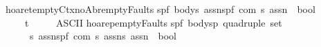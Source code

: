 \begin{isabellebody}
\isanewline
{\isachardoublequoteopen}{\isacharunderscore}hoaret{\isacharunderscore}emptyCtx{\isacharunderscore}noAbr{\isacharunderscore}emptyFaults{\isachardoublequoteclose}{\isacharcolon}{\isacharcolon}\isanewline
{\isachardoublequoteopen}{\isacharbrackleft}{\isacharparenleft}{\isacharprime}s{\isacharcomma}{\isacharprime}p{\isacharcomma}{\isacharprime}f{\isacharparenright}\ body{\isacharcomma}{\isacharprime}s\ assn{\isacharcomma}{\isacharparenleft}{\isacharprime}s{\isacharcomma}{\isacharprime}p{\isacharcomma}{\isacharprime}f{\isacharparenright}\ com{\isacharcomma}\ {\isacharprime}s\ assn{\isacharbrackright}\ {\isacharequal}{\isachargreater}\ bool{\isachardoublequoteclose}\isanewline
\ \ \ \ {\isacharparenleft}{\isachardoublequoteopen}{\isacharparenleft}{}{\isacharunderscore}{\isacharslash}{\isasymturnstile}\isactrlsub t\ {\isacharparenleft}{\isacharunderscore}{\isacharslash}\ {\isacharparenleft}{\isacharunderscore}{\isacharparenright}{\isacharslash}\ {\isacharunderscore}{\isacharparenright}{\isacharparenright}{\isachardoublequoteclose}\ {\isacharbrackleft}{}{}{\isacharcomma}{}{}{}{}{\isacharcomma}{}{}{\isacharcomma}{}{}{}{}{\isacharbrackright}{}{}{\isacharparenright}\isanewline
\isanewline
\isanewline
{}\isamarkupfalse%
\ {\isacharparenleft}ASCII{\isacharparenright}\isanewline
\isanewline
{\isachardoublequoteopen}{\isacharunderscore}hoarep{\isacharunderscore}emptyFaults{\isachardoublequoteclose}{\isacharcolon}{\isacharcolon}\isanewline
{\isachardoublequoteopen}{\isacharbrackleft}{\isacharparenleft}{\isacharprime}s{\isacharcomma}{\isacharprime}p{\isacharcomma}{\isacharprime}f{\isacharparenright}\ body{\isacharcomma}{\isacharparenleft}{\isacharprime}s{\isacharcomma}{\isacharprime}p{\isacharparenright}\ quadruple\ set{\isacharcomma}\isanewline
\ \ \ \ \ {\isacharprime}s\ assn{\isacharcomma}{\isacharparenleft}{\isacharprime}s{\isacharcomma}{\isacharprime}p{\isacharcomma}{\isacharprime}f{\isacharparenright}\ com{\isacharcomma}\ {\isacharprime}s\ assn{\isacharcomma}{\isacharprime}s\ assn{\isacharbrackright}\ {\isasymRightarrow}\ bool{\isachardoublequoteclose}\isanewline
\ \ \ {\isacharparenleft}{\isachardoublequoteopen}{\isacharparenleft}{}{\isacharunderscore}{\isacharcomma}{\isacharunderscore}{\isacharslash}{\isacharbar}{\isacharminus}\ {\isacharparenleft}{\isacharunderscore}{\isacharslash}\ {\isacharparenleft}{\isacharunderscore}{\isacharparenright}{\isacharslash}\ {\isacharunderscore}{\isacharcomma}{\isacharslash}{\isacharunderscore}{\isacharparenright}{\isacharparenright}{\isachardoublequoteclose}\ {\isacharbrackleft}{}{}{\isacharcomma}{}{}{\isacharcomma}{}{}{}{}{\isacharcomma}{}{}{\isacharcomma}{}{}{}{}{\isacharcomma}{}{}{}{}{\isacharbrackright}{}{}{\isacharparenright}\isanewline

\end{isabellebody}
